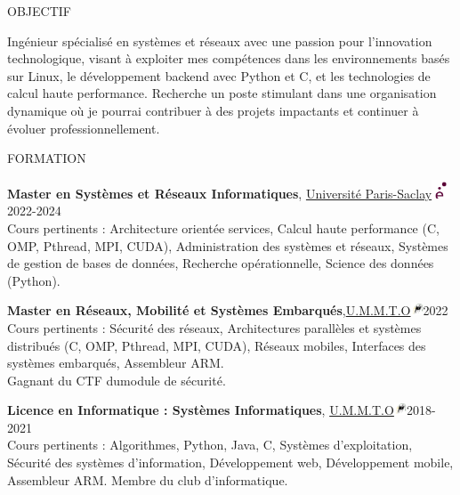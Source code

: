 \documentclass{resume}
\begin{document}

\begin{rSection}{OBJECTIF}

{Ingénieur spécialisé en systèmes et réseaux avec une passion pour l'innovation technologique, visant à exploiter mes compétences dans les environnements basés sur Linux, le développement backend avec Python et C, et les technologies de calcul haute performance. Recherche un poste stimulant dans une organisation dynamique où je pourrai contribuer à des projets impactants et continuer à évoluer professionnellement.}

\end{rSection}

\begin{rSection}{FORMATION}

{\bf Master en Systèmes et Réseaux Informatiques},  \href{https://www.universite-paris-saclay.fr/}{Université Paris-Saclay\includegraphics[height=1.5em]{../Ressource/petitlogo.png}} \hfill {2022-2024}\\
Cours pertinents : Architecture orientée services, Calcul haute performance (C, OMP, Pthread, MPI, CUDA), Administration des systèmes et réseaux, Systèmes de gestion de bases de données, Recherche opérationnelle, Science des données (Python).

{\bf Master en Réseaux, Mobilité et Systèmes Embarqués},\href{https://www.ummto.dz/}{U.M.M.T.O\includegraphics[height=1em]{../Ressource/ummto.png}}\hfill {2022}\\
Cours pertinents : Sécurité des réseaux, Architectures parallèles et systèmes distribués (C, OMP, Pthread, MPI, CUDA), Réseaux mobiles, Interfaces des systèmes embarqués, Assembleur ARM.\\
Gagnant du CTF dumodule de sécurité.

{\bf Licence en Informatique : Systèmes Informatiques}, \href{https://www.ummto.dz/}{U.M.M.T.O\includegraphics[height=1em]{../Ressource/ummto.png}}\hfill {2018-2021}\\
Cours pertinents : Algorithmes, Python, Java, C, Systèmes d'exploitation, Sécurité des systèmes d'information, Développement web, Développement mobile, Assembleur ARM.
Membre du club d'informatique.
\end{rSection}
\end{document}

